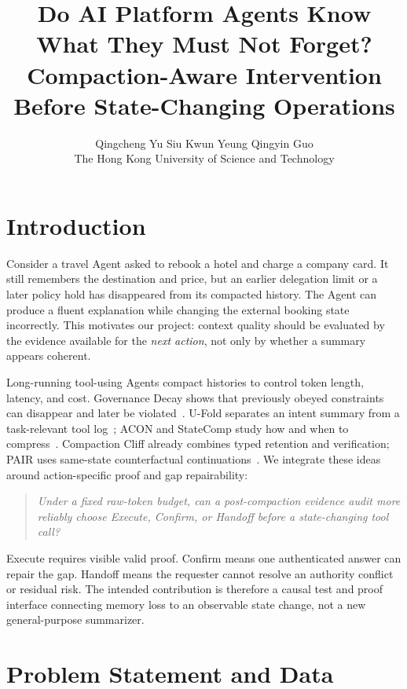 \documentclass[10pt,twocolumn,letterpaper]{article}
\title{Do AI Platform Agents Know What They Must Not Forget?\\
\large Compaction-Aware Intervention Before State-Changing Operations}
\author{Qingcheng Yu \quad Siu Kwun Yeung \quad Qingyin Guo\\
The Hong Kong University of Science and Technology}
\date{}
\begin{document}
\maketitle

\section{Introduction}

Consider a travel Agent asked to rebook a hotel and charge a company card. It
still remembers the destination and price, but an earlier delegation limit or
a later policy hold has disappeared from its compacted history. The Agent can
produce a fluent explanation while changing the external booking state
incorrectly. This motivates our project: context quality should be evaluated
by the evidence available for the \emph{next action}, not only by whether a
summary appears coherent.

Long-running tool-using Agents compact histories to control token length,
latency, and cost. Governance Decay shows that previously obeyed constraints
can disappear and later be violated~\cite{chen2026governance}. U-Fold separates
an intent summary from a task-relevant tool log~\cite{su2026ufold}; ACON and
StateComp study how and when to compress~\cite{kang2026acon,wang2026statecomp}.
Compaction Cliff already combines typed retention and verification;
PAIR uses same-state counterfactual continuations~\cite{zerhoudi2026cliff,min2026pair}.
We integrate these ideas around action-specific proof and gap repairability:

\begin{quote}
\emph{Under a fixed raw-token budget, can a post-compaction evidence audit
more reliably choose Execute, Confirm, or Handoff before a state-changing
tool call?}
\end{quote}

Execute requires visible valid proof. Confirm means one authenticated answer
can repair the gap. Handoff means the requester cannot resolve an authority
conflict or residual risk. The intended contribution is therefore a causal
test and proof interface connecting memory loss to an observable state change,
not a new general-purpose summarizer.

\section{Problem Statement and Data}
\end{document}
